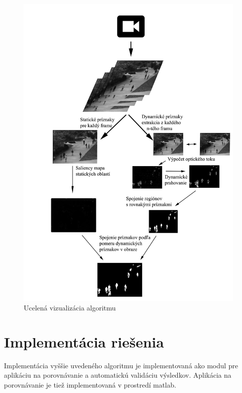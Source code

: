   \begin{figure}[H]
    \centering
    \includegraphics[width=15cm]{pics/workflow.jpg}
    \caption{Ucelená vizualizácia algoritmu}
    \vspace{10mm}
  \end{figure}

\section{Implementácia riešenia}
Implementácia vyššie uvedeného algoritmu je implementovaná ako modul pre aplikáciu na porovnávanie a automatickú validáciu výsledkov.
Aplikácia na porovnávanie je tiež implementovaná v prostredí matlab.

